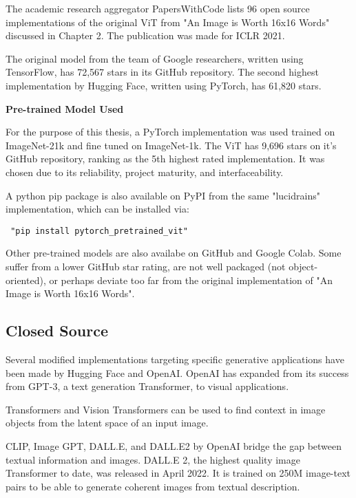 The academic research aggregator PapersWithCode lists 96 open source implementations of 
the original ViT from "An Image is Worth 16x16 Words" discussed in Chapter 2. 
The publication was made for ICLR 2021. \citep{Papers16}

The original model from the team of Google researchers, written using TensorFlow, has 72,567 stars in its GitHub repository.
The second highest implementation by Hugging Face, written using PyTorch, has 61,820 stars. 


\vspace{10mm}

\textbf{Pre-trained Model Used}

For the purpose of this thesis, a PyTorch implementation was used trained on ImageNet-21k
and fine tuned on ImageNet-1k. The ViT has 9,696 stars on it's GitHub repository,
ranking as the 5th highest rated implementation. It was chosen due to its reliability,
project maturity, and interfaceability. \citep{Papers16}

\vspace{5mm}

A python pip package is also available on PyPI from the same "lucidrains" implementation,
which can be installed via: 
\begin{verbatim} "pip install pytorch_pretrained_vit" \end{verbatim}


Other pre-trained models are also availabe on GitHub and Google Colab. 
Some suffer from a lower GitHub star rating, are not well packaged (not object-oriented), or perhaps deviate too far
from the original implementation of "An Image is Worth 16x16 Words". 


\subsection{Closed Source}


Several modified implementations targeting specific generative applications have been made by Hugging Face and OpenAI.
OpenAI has expanded from its success from GPT-3, a text generation Transformer, to visual applications.

Transformers and Vision Transformers can be used to find context in image objects from the latent space of an input image.

CLIP, Image GPT, DALL.E, and DALL.E2 by OpenAI bridge the gap between textual information and images.
DALL.E 2, the highest quality image Transformer to date, was released in April 2022.
It is trained on 250M image-text pairs to be able to generate coherent images from textual description. \citep{Dalle2}

